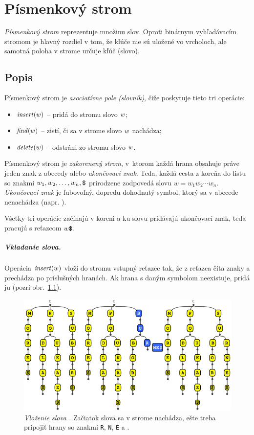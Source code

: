 
\chapter{Písmenkový strom}\label{chap:trie}

\emph{Písmenkový strom} reprezentuje množinu slov. Oproti binárnym 
vyhľadávacím stromom je hlavný rozdiel v tom, že kľúče nie sú uložené 
vo vrcholoch, ale samotná poloha v strome určuje kľúč (slovo). 

\section{Popis}\label{sec:trie:popis}
Písmenkový strom je \emph{asociatívne pole (slovník)}, čiže 
poskytuje tieto tri operácie:
\begin{itemize}
\item $\mathop{\mathit{insert}}(w)$ -- pridá do stromu slovo $w$;
\item $\mathop{\mathit{find}}(w)$ -- zistí, či sa v strome slovo $w$ nachádza;
\item $\mathop{\mathit{delete}}(w)$ -- odstráni zo stromu slovo $w$.
\end{itemize}
Písmenkový strom je \emph{zakorenený strom}, v~ktorom každá hrana obsahuje 
práve jeden znak z abecedy alebo \emph{ukončovací znak}. Teda, každá cesta 
z koreňa do listu so znakmi $w_1, w_2, \ldots, w_n, \hbox{\tt\$}$ prirodzene 
zodpovedá slovu $w=w_1w_2\cdots w_n$. \emph{Ukončovací znak} je ľubovoľný, 
dopredu dohodnutý symbol, ktorý sa v abecede nenachádza (napr. \uz). 

Všetky tri operácie začínajú v koreni a ku slovu pridávajú ukončovací znak, 
teda pracujú s reťazcom $w\hbox{\tt\$}$. 

\paragraph{Vkladanie slova.}%
Operácia $\mathop{\mathit{insert}}(w)$ vloží do stromu vstupný reťazec tak, že z reťazca číta znaky 
a prechádza po príslušných hranách. Ak hrana s daným symbolom neexistuje, 
pridá ju (pozri obr.~\ref{img:trieinsert}).

\begin{figure}
\centering
\includegraphics[width=0.9\columnwidth]{obrazky/trieinsertsmall.png}
\caption{\emph{Vloženie slova .} Začiatok slova 
 sa v strome nachádza, ešte treba pripojiť hrany 
so znakmi {\tt R}, {\tt N}, {\tt E} a \uz.} 
\label{img:trieinsert} 
\end{figure}

